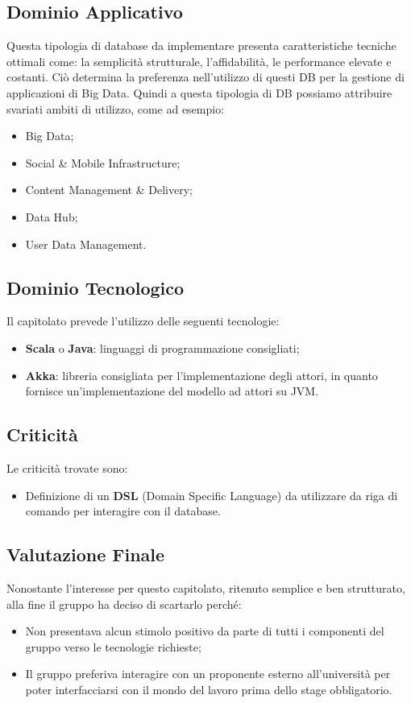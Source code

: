 \subsection{Dominio Applicativo}
Questa tipologia di database da implementare presenta caratteristiche tecniche ottimali come: la semplicità strutturale, l'affidabilità, le performance elevate e costanti.
Ciò determina la preferenza nell'utilizzo di questi DB per la gestione di applicazioni di Big Data.
Quindi a questa tipologia di DB possiamo attribuire svariati ambiti di utilizzo, come ad esempio:
\begin{itemize}
\item Big Data; 
\item Social \& Mobile Infrastructure;
\item Content Management \& Delivery;
\item Data Hub;
\item User Data Management. 
\end{itemize}

\subsection{Dominio Tecnologico}
Il capitolato prevede l'utilizzo delle seguenti tecnologie: 
\begin{itemize}
\item \textbf{Scala} o \textbf{Java}: linguaggi di programmazione consigliati;
\item \textbf{Akka}: libreria consigliata per l'implementazione degli attori, in quanto fornisce un'implementazione del modello ad attori su JVM.
\end{itemize}

\subsection{Criticità}
Le criticità trovate sono:
\begin{itemize}
\item Definizione di un \textbf{DSL} (Domain Specific Language) da utilizzare da riga di comando per interagire con il database.
\end{itemize}

\subsection{Valutazione Finale}
Nonostante l'interesse per questo capitolato, ritenuto semplice e ben strutturato, alla fine il gruppo ha deciso di scartarlo perché:
\begin{itemize}
\item Non presentava alcun stimolo positivo da parte di tutti i componenti del gruppo verso le tecnologie richieste;
\item Il gruppo preferiva interagire con un proponente esterno all'università per poter interfacciarsi con il mondo del lavoro prima dello stage obbligatorio.
\end{itemize}
